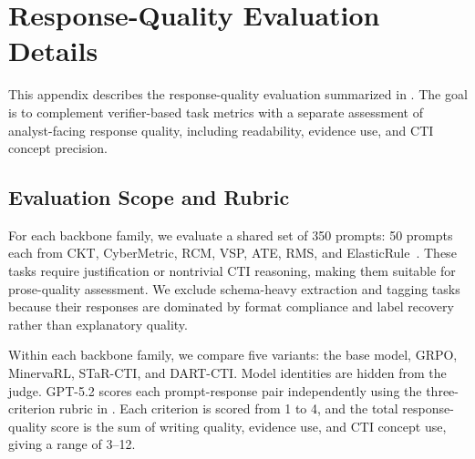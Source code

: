 \section{Response-Quality Evaluation Details}
\label{app:response-quality-eval}

This appendix describes the response-quality evaluation summarized in . The goal is to complement verifier-based task metrics with a separate assessment of analyst-facing response quality, including readability, evidence use, and CTI concept precision.

\subsection{Evaluation Scope and Rubric}
\label{app:response-quality-scope}

For each backbone family, we evaluate a shared set of 350 prompts: 50 prompts each from CKT, CyberMetric, RCM, VSP, ATE, RMS, and ElasticRule~\citep{elastic_detection_rules}. These tasks require justification or nontrivial CTI reasoning, making them suitable for prose-quality assessment. We exclude schema-heavy extraction and tagging tasks because their responses are dominated by format compliance and label recovery rather than explanatory quality.

Within each backbone family, we compare five variants: the base model, GRPO, MinervaRL, STaR-CTI, and DART-CTI. Model identities are hidden from the judge. GPT-5.2 scores each prompt-response pair independently using the three-criterion rubric in . Each criterion is scored from 1 to 4, and the total response-quality score is the sum of writing quality, evidence use, and CTI concept use, giving a range of 3--12.

